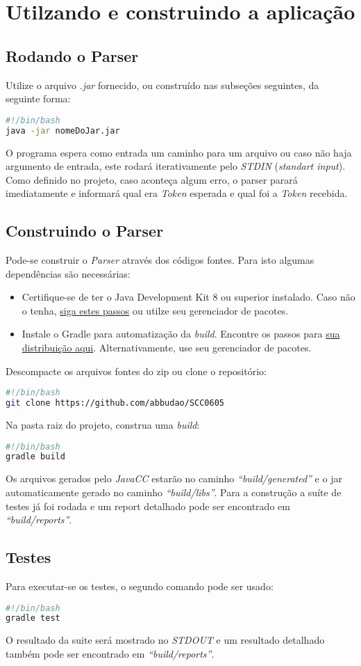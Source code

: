 \documentclass[a4paper,12pt]{article}
\begin{document}
\section{Utilzando e construindo a aplicação}
\subsection{Rodando o Parser}
Utilize o arquivo \emph{.jar} fornecido, ou construído nas subseções seguintes, da seguinte forma:
\begin{lstlisting}[language=bash,caption={Executando o Parser}]
#!/bin/bash
java -jar nomeDoJar.jar
\end{lstlisting}
O programa espera como entrada um caminho para um arquivo ou caso não haja argumento de entrada, este rodará iterativamente pelo \emph{STDIN} (\emph{standart input}). Como definido no projeto, caso aconteça algum erro, o parser parará imediatamente e informará qual era \emph{Token} esperada e qual foi a \emph{Token} recebida.

\subsection{Construindo o Parser}
Pode-se construir o \emph{Parser} através dos códigos fontes. Para isto algumas dependências são necessárias:
\begin{itemize}
\item Certifique-se de ter o Java Development Kit 8 ou superior instalado. Caso não o tenha, \href{https://docs.oracle.com/javase/8/docs/technotes/guides/install/install_overview.html}{siga estes passos} ou utilze seu gerenciador de pacotes.
\item Instale o Gradle para automatização da \emph{build}. Encontre os passos para \href{https://gradle.org/install/}{sua distribuição aqui}. Alternativamente, use seu gerenciador de pacotes.
\end{itemize}
Descompacte os arquivos fontes do zip ou clone o repositório:
\begin{lstlisting}[language=bash,caption={Obtendo os arquivos fontes}]
#!/bin/bash
git clone https://github.com/abbudao/SCC0605 
\end{lstlisting}
Na pasta raiz do projeto, construa uma \emph{build}:
\begin{lstlisting}[language=bash,caption={Construção automatizada}]
#!/bin/bash
gradle build
\end{lstlisting}
Os arquivos gerados pelo \emph{JavaCC} estarão no caminho \emph{``build/generated''}
 e o jar automaticamente gerado no caminho \emph{``build/libs''}. Para a construção a suíte de testes já foi rodada e um report detalhado pode ser encontrado em \emph{``build/reports''}.
 
\subsection{Testes}
Para executar-se os testes, o segundo comando pode ser usado:
\begin{lstlisting}[language=bash,caption={Rodando a suíte de testes}]
#!/bin/bash
gradle test 
\end{lstlisting}
O resultado da suite será mostrado no \emph{STDOUT} e um resultado detalhado também pode ser encontrado
em \emph{``build/reports''}.
\end{document}
